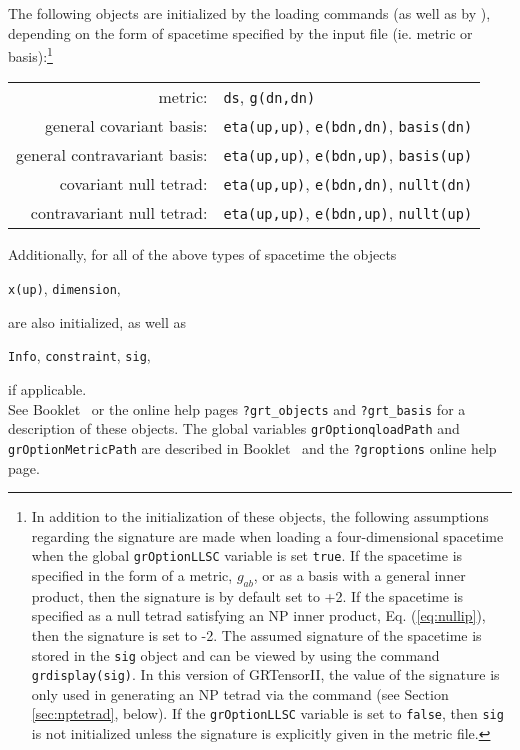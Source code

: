 \documentclass{article}
\begin{document}
The following objects are initialized by the loading commands (as well
as by ), depending on the form of spacetime specified by
the input file (ie. metric or basis):\footnote{In addition to the
initialization of these objects, the following assumptions regarding
the signature are made when loading a four-dimensional spacetime when
the global \texttt{grOptionLLSC} variable is set \texttt{true}. If the
spacetime is specified in the form of a metric, $g_{ab}$, or as a
basis with a general inner product, then the signature is by default
set to +2.  If the spacetime is specified as a null tetrad satisfying
an NP inner product, Eq. (\ref{eq:nullip}), then the signature is set
to -2. The assumed signature of the spacetime is stored in the
\texttt{sig} object and can be viewed by using the command
\texttt{grdisplay(sig)}.
 In this version of GRTensorII, the value of the signature
is only used in generating an NP tetrad via the 
command (see Section \ref{sec:nptetrad}, below). If the \texttt{grOptionLLSC}
variable is set to \texttt{false}, then \texttt{sig} is not initialized
unless the signature is explicitly given in the metric file.}
\begin{center}
  \begin{tabular}{rl}
    metric: & \texttt{ds}, \texttt{g(dn,dn)} \\
    general covariant basis: & \texttt{eta(up,up)}, \texttt{e(bdn,dn)},
      \texttt{basis(dn)} \\
    general contravariant basis: & \texttt{eta(up,up)}, \texttt{e(bdn,up)},
      \texttt{basis(up)} \\
    covariant null tetrad: & \texttt{eta(up,up)}, \texttt{e(bdn,dn)},
      \texttt{nullt(dn)} \\
    contravariant null tetrad: & \texttt{eta(up,up)}, \texttt{e(bdn,up)},
      \texttt{nullt(up)} \\
  \end{tabular}
\end{center}
Additionally, for all of the above types of spacetime the objects
\begin{center}
  \texttt{x(up)}, \texttt{dimension},
\end{center}
are also initialized, as well as
\begin{center}
  \texttt{Info}, \texttt{constraint}, \texttt{sig},
\end{center}
if applicable.\\

See Booklet \grCalcRef~or the online help pages \texttt{?grt\_objects}
and \texttt{?grt\_basis} for a description of these objects. The
global variables \texttt{grOptionqloadPath} and
\texttt{grOptionMetricPath} are described in Booklet \grSetupRef~and
the \texttt{?groptions} online help page.
\end{document}
